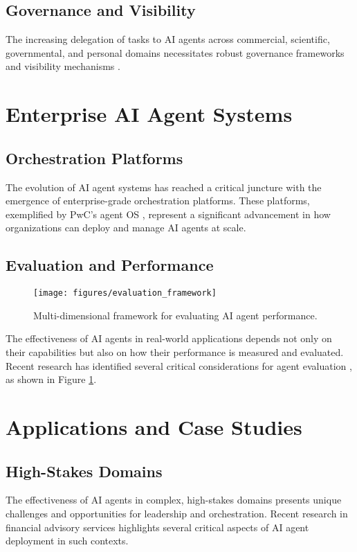 \documentclass[conference]{IEEEtran}
\begin{document}
\subsection{Governance and Visibility}
The increasing delegation of tasks to AI agents across commercial, scientific, governmental, and personal domains necessitates robust governance frameworks and visibility mechanisms \cite{chan2024visibility}.

\section{Enterprise AI Agent Systems}
\subsection{Orchestration Platforms}
The evolution of AI agent systems has reached a critical juncture with the emergence of enterprise-grade orchestration platforms. These platforms, exemplified by PwC's agent OS \cite{pwc2025agentos}, represent a significant advancement in how organizations can deploy and manage AI agents at scale.

\subsection{Evaluation and Performance}
\begin{figure}[t]
\centering
\texttt{[image: figures/evaluation\_framework]}
\caption{Multi-dimensional framework for evaluating AI agent performance.}
\label{fig:evaluation}
\end{figure}

The effectiveness of AI agents in real-world applications depends not only on their capabilities but also on how their performance is measured and evaluated. Recent research has identified several critical considerations for agent evaluation \cite{kapoor2024agents}, as shown in Figure \ref{fig:evaluation}.

\section{Applications and Case Studies}
\subsection{High-Stakes Domains}
The effectiveness of AI agents in complex, high-stakes domains presents unique challenges and opportunities for leadership and orchestration. Recent research in financial advisory services \cite{takayanagi2024generative} highlights several critical aspects of AI agent deployment in such contexts.
\end{document}
